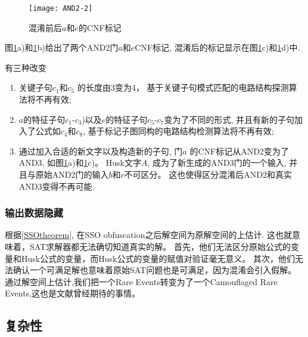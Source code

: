 \begin{figure}[b]
\centering
\texttt{[image: AND2-2]}
\caption{混淆前后$a$和$e$的CNF标记}
\label{fig_beforeafter}
\end{figure}

图\ref{fig_beforeafter}a)和\ref{fig_beforeafter}b)给出了两个AND2门$a$和$e$CNF标记,
混淆后的标记显示在图\ref{fig_beforeafter}c)和\ref{fig_beforeafter}d)中.

有三种改变
\begin{enumerate}
 \item
 关键子句$c_1$和$c_5$ 的长度由3变为4，
基于关键子句模式匹配的电路结构探测算法\cite{csFu}将不再有效;
 \item
$a$的特征子句$c_1$-$c_3$)以及$e$的特征子句$c_5$-$c_7$变为了不同的形式,
并且有新的子句加入了公式如$c_4$和$c_8$,
基于标记子图同构的电路结构检测算法\cite{csRoy}将不再有效;
\item
 通过加入合适的新文字以及构造新的子句,
 门$a$ 的CNF标记从AND2变为了AND3,
如图\ref{fig_beforeafter}a)和\ref{fig_beforeafter}c)。
Husk文字$A$,
成为了新生成的AND3门的一个输入,
并且与原始AND2门的输入$b$和$c$不可区分。
这也使得区分混淆后AND2和真实AND3变得不再可能.
\end{enumerate}
%
\subsubsection{输出数据隐藏}
根据\ref{SSOtheorem},
在SSO obfuscation之后解空间为原解空间的上估计.
这也就意味着，SAT求解器都无法确切知道真实的解。
首先，他们无法区分原始公式的变量和Husk公式的变量，而Husk公式的变量的赋值对验证毫无意义。
其次，他们无法确认一个可满足解也意味着原始SAT问题也是可满足，因为混淆会引入假解。
通过解空间上估计,我们把一个Rare Events转变为了一个Camouflaged Rare Events,这也是文献\cite{HV-grid}曾经期待的事情。

\subsection{复杂性}
